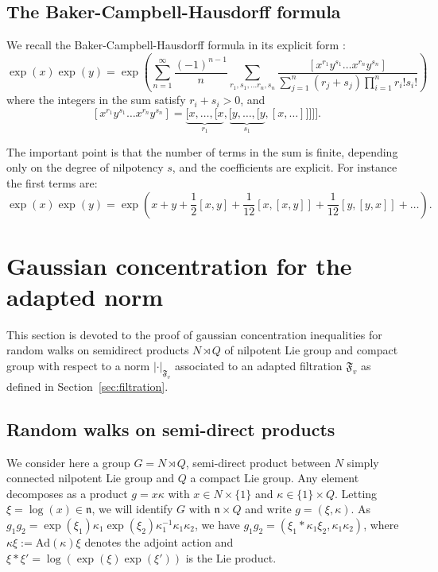 \documentclass[11pt,leqno]{article}
\theoremstyle{plain}
\theoremstyle{definition}
\theoremstyle{remark}
\numberwithin{equation}{section}
\newcommand{\Ad}{\mathrm{Ad}}
\begin{document}
\subsection{The Baker-Campbell-Hausdorff formula}\label{sec:BCH}

We recall the Baker-Campbell-Hausdorff
formula in its explicit form \cite{Dynkin} : 
\[
\exp(x)\exp(y)=\exp\left(\sum_{n=1}^{\infty}\frac{(-1)^{n-1}}{n}\sum_{r_{1},s_{1},\dots r_{n},s_{n}}\frac{[x^{r_{1}}y^{s_{1}}\dots x^{r_{n}}y^{s_{n}}]}{\sum_{j=1}^{n}(r_{j}+s_{j})\prod_{i=1}^{n}r_{i}!s_{i}!}\right)
\]
where the integers in the sum satisfy $r_{i}+s_{i}>0$, and 
\[
[x^{r_{1}}y^{s_{1}}\dots x^{r_{n}}y^{s_{n}}]=\underbrace{[x,\dots,[x}_{r_{1}},\underbrace{[y,\dots,[y}_{s_{1}},[x,\dots]]]]].
\]

The important point is that the number of terms in the sum is finite, depending only on the degree of nilpotency $s$, and the coefficients are explicit. For instance the first terms are: 
\[
\exp(x)\exp(y)=\exp\left(x+y+\frac{1}{2}[x,y]+\frac{1}{12}[x,[x,y]]+\frac{1}{12}[y,[y,x]]+\dots\right).
\]


\section{Gaussian concentration for the adapted norm}\label{sec:NQ}

This section is devoted to the proof of gaussian concentration inequalities for random walks on semidirect products $N\rtimes Q$ of nilpotent Lie group and compact group with respect to a norm $|\cdot|_{\mathfrak{F}_v}$ associated to an adapted filtration $\mathfrak{F}_v$ as defined in Section~\ref{sec:filtration}.



\subsection{Random walks on semi-direct products}\label{subsec:notations}

We consider here a group $G=N \rtimes Q$, semi-direct product between $N$ simply connected nilpotent Lie group and $Q$ a compact Lie group. Any element decomposes as a product $g=x\kappa$ with $x \in N \times\{1\}$ and $\kappa \in \{1\}\times Q$. Letting $\xi=\log(x)\in \mathfrak{n}$, we will identify $G$ with $\mathfrak{n}\times Q$ and write $g=(\xi,\kappa)$. As $g_1g_2=\exp(\xi_1)\kappa_1 \exp(\xi_2) \kappa_1^{-1} \kappa_1 \kappa_2$, we have $g_1g_2=(\xi_1\ast\kappa_1\xi_2, \kappa_1\kappa_2)$, where $\kappa\xi:=\Ad(\kappa)\xi$ denotes the adjoint action and $\xi\ast\xi'=\log(\exp(\xi)\exp(\xi'))$ is the Lie product.
\end{document}
